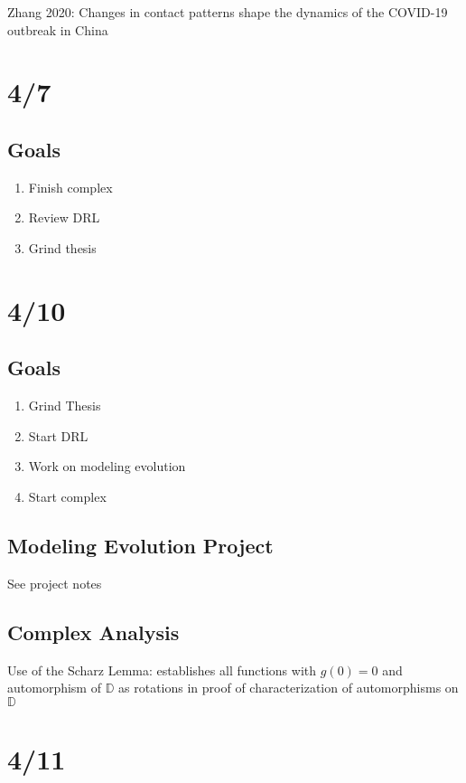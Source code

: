 \documentclass[11pt]{article}
\theoremstyle{remark}
\begin{document}
Zhang 2020: Changes in contact patterns shape the dynamics of the COVID-19 outbreak in China 

\section{4/7}

\subsection{Goals}

\begin{enumerate}
	\item Finish complex
	\item Review DRL
	\item Grind thesis
\end{enumerate}

\section{4/10}

\subsection{Goals}

\begin{enumerate}
	\item Grind Thesis
	\item Start DRL
	\item Work on modeling evolution
	\item Start complex
\end{enumerate}

\subsection{Modeling Evolution Project}

See project notes

\subsection{Complex Analysis}

Use of the Scharz Lemma: establishes all functions with $g(0) = 0$ and automorphism of $\mathbb{D}$ as rotations in proof of characterization of automorphisms on $\mathbb{D}$

\section{4/11}
\end{document}
